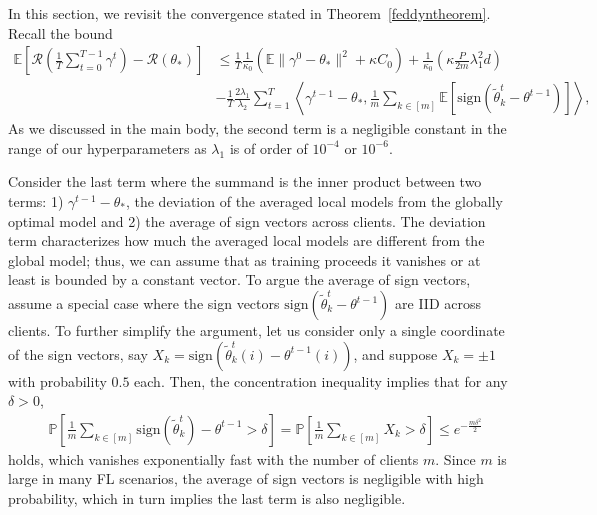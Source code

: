 \documentclass{article} %
\begin{document}
In this section, we revisit the convergence stated in Theorem~\ref{feddyntheorem}. Recall the bound
\begin{align*}
    \mathbb{E} \left[ \mathcal{R} \left( \frac{1}{T}\sum_{t=0}^{T-1}\gamma^t \right)-\mathcal{R}(\theta_*) \right] &\le\frac{1}{T}\frac{1}{\kappa_0}(\mathbb{E}\lVert  \gamma^{0}-\theta_* \rVert^2+\kappa C_{0})+\frac{1}{\kappa_0}(\kappa\frac{P}{2m}\lambda_1^2d)\nonumber\\
    &-\frac{1}{T}\frac{2\lambda_1}{\lambda_2}\sum_{t=1}^T\left\langle \gamma^{t-1}-\theta_*, \frac{1}{m}\sum_{k\in [m]}\mathbb{E}[\mathrm{sign}(\tilde{\theta}_k^t-\theta^{t-1})]\right\rangle,
\end{align*}
As we discussed in the main body, the second term is a negligible constant in the range of our hyperparameters as $\lambda_1$ is of order of $10^{-4}$ or $10^{-6}$.

Consider the last term where the summand is the inner product between two terms: 1) $\gamma^{t-1} - \theta_*$, the deviation of the averaged local models from the globally optimal model and 2) the average of sign vectors across clients. The deviation term characterizes how much the averaged local models are different from the global model; thus, we can assume that as training proceeds it vanishes or at least is bounded by a constant vector. To argue the average of sign vectors, assume a special case where the sign vectors $\mathrm{sign}(\tilde{\theta}_k^t - \theta^{t-1})$ are IID across clients. To further simplify the argument, let us consider only a single coordinate of the sign vectors, say $X_k=\mathrm{sign}(\tilde{\theta}_k^t(i)-\theta^{t-1}(i))$, and suppose $X_k = \pm 1$ with probability $0.5$ each. Then, the concentration inequality \citep{Durrett2019} implies that for any $\delta > 0$,
\begin{align*}
    &\mathbb{P}\left[ \frac{1}{m} \sum_{k\in [m]} \mathrm{sign}(\tilde{\theta}_k^t)-\theta^{t-1} > \delta \right] =\mathbb{P}\left[ \frac{1}{m} \sum_{k\in [m]}X_k > \delta \right] \le e^{-\frac{m\delta^2}{2}}
\end{align*}
holds, which vanishes exponentially fast with the number of clients $m$. Since $m$ is large in many FL scenarios, the average of sign vectors is negligible with high probability, which in turn implies the last term is also negligible.
\end{document}
